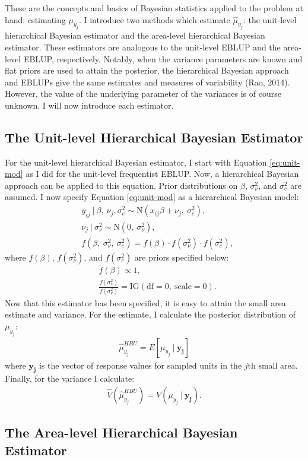\documentclass[12pt,twoside]{reedthesis}
\begin{document}
These are the concepts and basics of Bayesian statistics applied to the problem at hand: estimating \(\mu_{y_j}\). I introduce two methods which estimate \(\hat\mu_{y_j}\): the unit-level hierarchical Bayesian estimator and the area-level hierarchical Bayesian estimator. These estimators are analogous to the unit-level EBLUP and the area-level EBLUP, respectively. Notably, when the variance parameters are known and flat priors are used to attain the posterior, the hierarchical Bayesian approach and EBLUPs give the same estimates and measures of variability (Rao, 2014). However, the value of the underlying parameter of the variances is of course unknown. I will now introduce each estimator.

\hypertarget{the-unit-level-hierarchical-bayesian-estimator}{%
\subsection{The Unit-level Hierarchical Bayesian Estimator}\label{the-unit-level-hierarchical-bayesian-estimator}}

For the unit-level hierarchical Bayesian estimator, I start with Equation \eqref{eq:unit-mod} as I did for the unit-level frequentist EBLUP. Now, a hierarchical Bayesian approach can be applied to this equation. Prior distributions on \(\beta\), \(\sigma^2_\nu\), and \(\sigma^2_e\) are assumed. I now specify Equation \eqref{eq:unit-mod} as a hierarchical Bayesian model:
\begin{align}
&y_{ij} ~\vert~ \beta,~ \nu_j, \sigma^2_e \sim \text{N}(x_{ij}\beta + \nu_j,~ \sigma^2_e), \nonumber \\
&\nu_j ~\vert~ \sigma^2_\nu \sim \text{N}(0,~ \sigma^2_\nu),\nonumber \\
&f(\beta,~ \sigma^2_\nu, ~\sigma^2_e) = f(\beta)\cdot f(\sigma^2_\nu) \cdot f(\sigma^2_e),
\end{align}
where \(f(\beta)\), \(f(\sigma^2_\nu)\), and \(f(\sigma^2_e)\) are priors specified below:
\begin{align*}
&f(\beta) \propto 1, \\
&\frac{f(\sigma^2_e)}{f(\sigma^2_\nu)} = \text{IG}(\text{df} = 0,~ \text{scale} = 0).
\end{align*}
Now that this estimator has been specified, it is easy to attain the small area estimate and variance. For the estimate, I calculate the posterior distribution of \(\mu_{y_j}\):
\begin{align}
\hat\mu_{y_j}^{HBU} = E[\mu_{y_j} ~\vert~ \mathbf{y_j}]
\end{align}
where \(\mathbf{y_j}\) is the vector of response values for sampled units in the \(j\)th small area. Finally, for the variance I calculate:
\begin{align}
\hat V(\hat \mu_{y_j}^{HBU}) = V(\mu_{y_j} ~\vert~ \mathbf{y_j}).
\end{align}
\hypertarget{the-area-level-hierarchical-bayesian-estimator}{%
\subsection{The Area-level Hierarchical Bayesian Estimator}\label{the-area-level-hierarchical-bayesian-estimator}}
\end{document}
